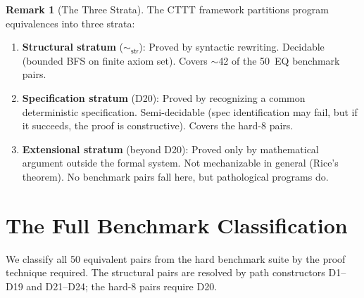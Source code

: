 \documentclass[11pt,a4paper]{report}
\theoremstyle{definition}
\newtheorem{remark}[definition]{Remark}
\theoremstyle{plain}
\begin{document}
\begin{remark}[The Three Strata]
The CTTT framework partitions program equivalences into three strata:
\begin{enumerate}
  \item \textbf{Structural stratum} ($\sim_{\mathsf{str}}$):
    Proved by syntactic rewriting.  Decidable (bounded BFS on finite
    axiom set).  Covers ${\sim}$42 of the 50~EQ benchmark pairs.
  \item \textbf{Specification stratum} (D20):
    Proved by recognizing a common deterministic specification.
    Semi-decidable (spec identification may fail, but if it succeeds,
    the proof is constructive).  Covers the hard-8 pairs.
  \item \textbf{Extensional stratum} (beyond D20):
    Proved only by mathematical argument outside the formal system.
    Not mechanizable in general (Rice's theorem).  No benchmark pairs
    fall here, but pathological programs do.
\end{enumerate}
\end{remark}


\section{The Full Benchmark Classification}
\label{sec:benchmark-classification}

We classify all 50 equivalent pairs from the hard benchmark suite by
the proof technique required.  The structural pairs are resolved by
path constructors D1--D19 and D21--D24; the hard-8 pairs require D20.
\end{document}
